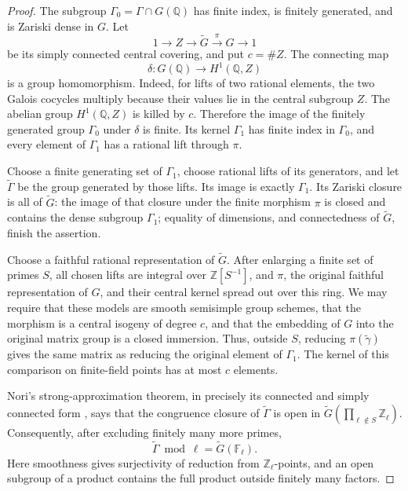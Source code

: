 \documentclass[11pt]{article}
\begin{document}
\begin{proof}
The subgroup \(\Gamma_0=\Gamma\cap G(\mathbb Q)\) has finite index,
is finitely generated, and is Zariski dense in \(G\). Let
\[
     1\longrightarrow Z\longrightarrow \widetilde G
          \xrightarrow{\pi}G\longrightarrow1
\]
be its simply connected central covering, and put \(c=\#Z\).
The connecting map
\[
               \delta:G(\mathbb Q)\longrightarrow H^1(\mathbb Q,Z)
\]
is a group homomorphism. Indeed, for lifts of two rational elements,
the two Galois cocycles multiply because their values lie in the
central subgroup \(Z\). The abelian group \(H^1(\mathbb Q,Z)\)
is killed by \(c\). Therefore the image of the finitely generated
group \(\Gamma_0\) under \(\delta\) is finite. Its kernel
\(\Gamma_1\) has finite index in \(\Gamma_0\), and every element
of \(\Gamma_1\) has a rational lift through \(\pi\).

Choose a finite generating set of \(\Gamma_1\), choose rational
lifts of its generators, and let \(\widetilde\Gamma\) be the
group generated by those lifts. Its image is exactly \(\Gamma_1\).
Its Zariski closure is all of \(\widetilde G\): the image of that
closure under the finite morphism \(\pi\) is closed and contains
the dense subgroup \(\Gamma_1\); equality of dimensions, and
connectedness of \(\widetilde G\), finish the assertion.

Choose a faithful rational representation of \(\widetilde G\).
After enlarging a finite set of primes \(S\), all chosen lifts
are integral over \(\mathbb Z[S^{-1}]\), and \(\pi\), the
original faithful representation of \(G\), and their central
kernel spread out over this ring. We may require that these
models are smooth semisimple group schemes, that the morphism
is a central isogeny of degree \(c\), and that the embedding
of \(G\) into the original matrix group is a closed immersion.
Thus, outside \(S\), reducing \(\pi(\widetilde\gamma)\) gives
the same matrix as reducing the original element of \(\Gamma_1\).
The kernel of this comparison on finite-field points has at
most \(c\) elements.

Nori's strong-approximation theorem, in precisely its
connected and simply connected form
\cite[Theorem 5.4, printed p. 274]{AC_Nori1987}, says that the
congruence closure of \(\widetilde\Gamma\) is open in
\(\widetilde G(\prod_{\ell\notin S}\mathbb Z_\ell)\).
Consequently, after excluding finitely many more primes,
\[
       \widetilde\Gamma\bmod\ell
                      =\widetilde G(\mathbb F_\ell).
\]
Here smoothness gives surjectivity of reduction from
\(\mathbb Z_\ell\)-points, and an open subgroup of a product
contains the full product outside finitely many factors.


\end{proof}
\end{document}
